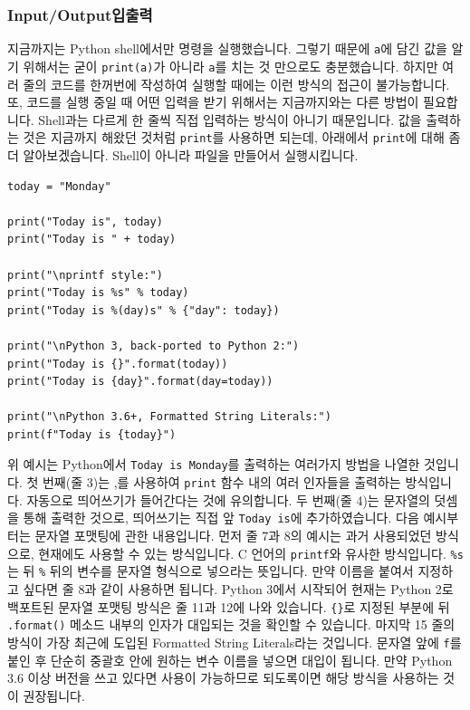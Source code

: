 \documentclass[../main.tex]{subfiles}
\begin{document}
\subsubsection{Input/Output입출력}
지금까지는 Python shell에서만 명령을 실행했습니다.
그렇기 때문에 \texttt{a}에 담긴 값을 알기 위해서는 굳이 \texttt{print(a)}가 아니라 \texttt{a}를 치는 것 만으로도 충분했습니다.
하지만 여러 줄의 코드를 한꺼번에 작성하여 실행할 때에는 이런 방식의 접근이 불가능합니다.
또, 코드를 실행 중일 때 어떤 입력을 받기 위해서는 지금까지와는 다른 방법이 필요합니다.
Shell과는 다르게 한 줄씩 직접 입력하는 방식이 아니기 때문입니다.
값을 출력하는 것은 지금까지 해왔던 것처럼 \texttt{print}를 사용하면 되는데, 아래에서 \texttt{print}에 대해 좀 더 알아보겠습니다.
Shell이 아니라 파일을 만들어서 실행시킵니다.
\begin{verbatim}
today = "Monday"

print("Today is", today)
print("Today is " + today)

print("\nprintf style:")
print("Today is %s" % today)
print("Today is %(day)s" % {"day": today})

print("\nPython 3, back-ported to Python 2:")
print("Today is {}".format(today))
print("Today is {day}".format(day=today))

print("\nPython 3.6+, Formatted String Literals:")
print(f"Today is {today}")
\end{verbatim}
위 예시는 Python에서 \texttt{Today is Monday}를 출력하는 여러가지 방법을 나열한 것입니다.
첫 번째(줄 3)는 ,를 사용하여 \texttt{print} 함수 내의 여러 인자들을 출력하는 방식입니다.
자동으로 띄어쓰기가 들어간다는 것에 유의합니다.
두 번째(줄 4)는 문자열의 덧셈을 통해 출력한 것으로, 띄어쓰기는 직접 앞 \texttt{Today is}에 추가하였습니다.
다음 예시부터는 문자열 포맷팅에 관한 내용입니다.
먼저 줄 7과 8의 예시는 과거 사용되었던 방식으로, 현재에도 사용할 수 있는 방식입니다.
C 언어의 \texttt{printf}와 유사한 방식입니다.
\texttt{\%s}는 뒤 \texttt{\%} 뒤의 변수를 문자열 형식으로 넣으라는 뜻입니다.
만약 이름을 붙여서 지정하고 싶다면 줄 8과 같이 사용하면 됩니다.
Python 3에서 시작되어 현재는 Python 2로 백포트된 문자열 포맷팅 방식은 줄 11과 12에 나와 있습니다.
\texttt{\{\}}로 지정된 부분에 뒤 \texttt{.format()} 메소드 내부의 인자가 대입되는 것을 확인할 수 있습니다.
마지막 15 줄의 방식이 가장 최근에 도입된 Formatted String Literals라는 것입니다.
문자열 앞에 \texttt{f}를 붙인 후 단순히 중괄호 안에 원하는 변수 이름을 넣으면 대입이 됩니다.
만약 Python 3.6 이상 버전을 쓰고 있다면 사용이 가능하므로 되도록이면 해당 방식을 사용하는 것이 권장됩니다.
\end{document}
